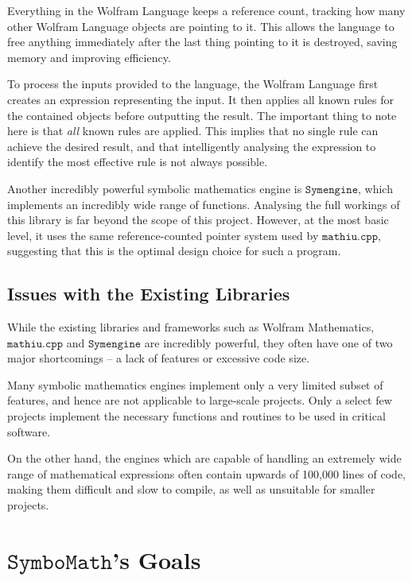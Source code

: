 \documentclass[12pt]{article}
\def\Symbo{{$\texttt{SymboMath}$}}
\begin{document}
Everything in the Wolfram Language keeps a reference count, tracking how many other Wolfram Language objects are pointing to it. This allows the language to free anything immediately after the last thing pointing to it is destroyed, saving memory and improving efficiency.

To process the inputs provided to the language, the Wolfram Language first creates an expression representing the input. It then applies all known rules for the contained objects before outputting the result. The important thing to note here is that \textit{all} known rules are applied. This implies that no single rule can achieve the desired result, and that intelligently analysing the expression to identify the most effective rule is not always possible.

Another incredibly powerful symbolic mathematics engine is $\texttt{Symengine}$\cite{symengine}, which implements an incredibly wide range of functions. Analysing the full workings of this library is far beyond the scope of this project. However, at the most basic level, it uses the same reference-counted pointer system used by $\texttt{mathiu.cpp}$, suggesting that this is the optimal design choice for such a program.

\subsection{Issues with the Existing Libraries}

While the existing libraries and frameworks such as Wolfram Mathematics, $\texttt{mathiu.cpp}$ and $\texttt{Symengine}$ are incredibly powerful, they often have one of two major shortcomings -- a lack of features or excessive code size.

Many symbolic mathematics engines implement only a very limited subset of features, and hence are not applicable to large-scale projects. Only a select few projects implement the necessary functions and routines to be used in critical software.

On the other hand, the engines which are capable of handling an extremely wide range of mathematical expressions often contain upwards of 100,000 lines of code, making them difficult and slow to compile, as well as unsuitable for smaller projects.

\pagebreak
\section{\Symbo's Goals} \label{symbogoals}
\end{document}
